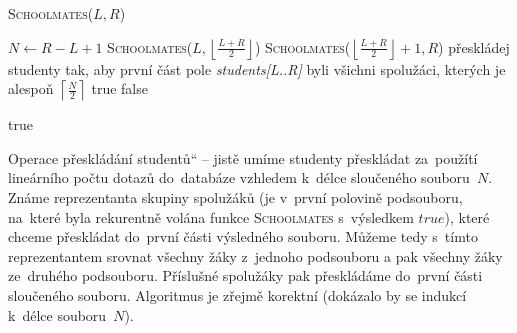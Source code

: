 \documentclass[12pt]{article}
\newcommand{\la}{\leftarrow}
\newcommand{\var}[1]{\textit{#1}}
\newcommand{\uv}[1]{\quotedblbase #1\textquotedblleft}
\begin{document}
\begin{algorithm}
\textsc{Schoolmates}($L,R$)
\begin{algorithmic}[1]
\STATE $N \la R-L+1$
\STATE \textsc{Schoolmates}($L,\left\lfloor\frac{L+R}{2} \right\rfloor$)
\STATE \textsc{Schoolmates}($\left\lfloor\frac{L+R}{2} \right\rfloor+1,R$)
\STATE přeskládej studenty tak, aby první část pole \var{students[L..R]} byli
všichni spolužáci, kterých je alespoň $\left\lceil\frac{N}{2} \right\rceil$
\RETURN true
\ELSE
\RETURN false
\ENDIF


\ELSE
\RETURN true
\ENDIF
\end{algorithmic}
\end{algorithm}
Operace \uv{přeskládání studentů} -- jistě umíme studenty přeskládat za~použítí
lineárního počtu dotazů do~databáze vzhledem k~délce sloučeného souboru~$N$. Známe
reprezentanta skupiny spolužáků (je v~první polovině podsouboru, na~které byla
rekurentně volána funkce \textsc{Schoolmates} s~výsledkem $true$), které chceme přeskládat do~první části
výsledného souboru. Můžeme tedy s~tímto reprezentantem srovnat všechny žáky
z~jednoho podsouboru a pak všechny žáky ze~druhého podsouboru. Příslušné spolužáky pak
přeskládáme do~první části sloučeného souboru. Algoritmus je zřejmě korektní (dokázalo by se
indukcí k~délce souboru~$N$).
\end{document}
